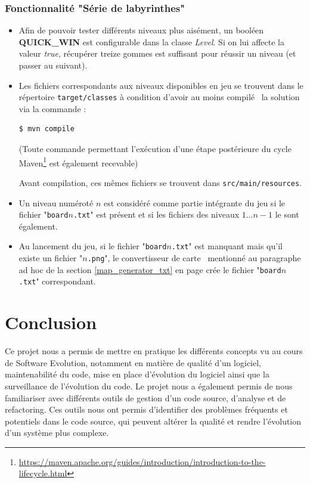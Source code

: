 \documentclass[12pt, openany]{report}
\begin{document}
\subsubsection{Fonctionnalité "Série de labyrinthes"}
\begin{itemize}
	\item Afin de pouvoir tester différents niveaux plus aisément, un booléen \mbox{\textbf{QUICK\_WIN}} est configurable dans la classe \mbox{\textit{Level}}.
	Si on lui affecte la valeur \textit{true}, récupérer treize gommes est suffisant pour réussir un niveau (et passer au suivant).
	\item Les fichiers correspondants aux niveaux disponibles en jeu se trouvent dans le répertoire \nolinkurl{target/classes} à condition d'avoir au moins \og compilé \fg \, la solution via la commande :
	\begin{lstlisting}[language=bash]
	$ mvn compile
	\end{lstlisting}
	(Toute commande permettant l'exécution d'une étape postérieure du cycle Maven\footnote{\url{https://maven.apache.org/guides/introduction/introduction-to-the-lifecycle.html}} est également recevable)
	
	Avant compilation, ces mêmes fichiers se trouvent dans \nolinkurl{src/main/resources}.
	\item Un niveau numéroté $n$ est considéré comme partie intégrante du jeu si le fichier "\nolinkurl{board}$n$\nolinkurl{.txt}" est présent et si les fichiers des niveaux $1...n-1$ le sont également.
	\item Au lancement du jeu, si le fichier "\nolinkurl{board}$n$\nolinkurl{.txt}" est manquant mais qu'il existe un fichier "$n$\nolinkurl{.png}", le \og convertisseur de carte \fg \,  mentionné au paragraphe ad hoc de la section \ref{map_generator_txt} en page \pageref{map_generator_txt} crée le fichier "\nolinkurl{board}$n$\nolinkurl{.txt}" correspondant.
\end{itemize}

\section{Conclusion}

Ce projet nous a permis de mettre en pratique les différents concepts vu au cours de Software Evolution, notamment en matière de qualité d'un logiciel, maintenabilité du code, mise en place d'évolution du logiciel ainsi que la surveillance de l'évolution du code. Le projet nous a également permis de nous familiariser avec différents outils de gestion d'un code source, d'analyse et de refactoring. Ces outils nous ont permis d'identifier des problèmes fréquents et potentiels dans le code source, qui peuvent altérer la qualité et rendre l'évolution d'un système plus complexe.
\end{document}
